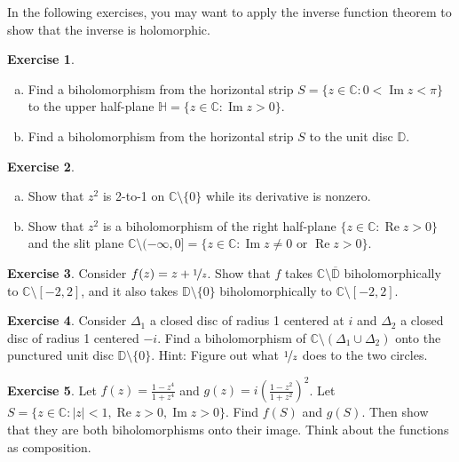 \documentclass[12pt,openany]{book}
\renewcommand{\Re}{\operatorname{Re}}
\renewcommand{\Im}{\operatorname{Im}}
\newcommand{\sabs}[1]{\lvert {#1} \rvert}
\newcommand{\C}{{\mathbb{C}}}
\newcommand{\D}{{\mathbb{D}}}
\newcommand{\bH}{{\mathbb{H}}}
\theoremstyle{plain}
\theoremstyle{remark}
\theoremstyle{definition}
\newenvironment{exbox}{%
    \def\FrameCommand{\vrule width 1pt \relax\hspace{10pt}}%
    \MakeFramed{\advance\hsize-\width\FrameRestore}%
}{%
    \endMakeFramed
}
\newenvironment{exparts}{%
    \leavevmode\begin{enumerate}[a),noitemsep,topsep=0pt,parsep=0pt,partopsep=0pt]
}{%
    \end{enumerate}
}
\theoremstyle{exercise}
\newtheorem{exercise}{Exercise}[section]
\theoremstyle{example}
\begin{document}
In the following exercises, you may want to apply the inverse
function theorem to show that the inverse is holomorphic.

\begin{exbox}
\begin{exercise}
\begin{exparts}
\item
Find a biholomorphism from the horizontal strip
$S = \{ z \in \C : 0 < \Im z < \pi \}$ to
the upper half-plane $\bH = \{ z \in \C : \Im z > 0 \}$.
\item
Find a biholomorphism from the horizontal strip
$S$ to the unit disc $\D$.
\end{exparts}
\end{exercise}

\begin{exercise}
\pagebreak[2]
\begin{exparts}
\item
Show that $z^2$ is 2-to-1 on $\C \setminus \{ 0 \}$ while its
derivative is nonzero.
\item
Show that $z^2$ is a biholomorphism of the right half-plane
$\{ z \in \C : \Re z > 0 \}$
and the slit plane $\C \setminus (-\infty,0] = \{ z \in \C : \Im z \not= 0 \text{ or } \Re z > 0 \}$.
\end{exparts}
\end{exercise}

\begin{exercise} \label{exercise:segmentcomplement}
Consider $f(z) = z+ \nicefrac{1}{z}$.  Show that $f$ takes $\C \setminus
\overline{\D}$ biholomorphically to $\C \setminus [-2,2]$, and it also takes
$\D \setminus \{ 0 \}$ biholomorphically to $\C \setminus [-2,2]$.
\end{exercise}

\begin{exercise}
Consider $\Delta_1$ a closed disc of radius 1 centered at $i$ and $\Delta_2$ a closed disc of radius 1 centered $-i$.
Find a biholomorphism of $\C \setminus (\Delta_1 \cup \Delta_2)$
onto the punctured unit disc $\D \setminus \{ 0 \}$.
Hint: Figure out what $\nicefrac{1}{z}$ does to the two circles.
\end{exercise}

\begin{exercise}
Let $f(z) = \frac{1-z^4}{1+z^4}$ and $g(z) = i {\left( \frac{1-z^2}{1+z^2}
\right)}^2$.  Let $S = \{ z \in \C : \sabs{z} < 1, \Re z > 0, \Im z > 0 \}$.
Find $f(S)$ and $g(S)$.  Then show that they are both biholomorphisms onto their
image.  Think about the functions as composition.
\end{exercise}


\end{exbox}
\end{document}

